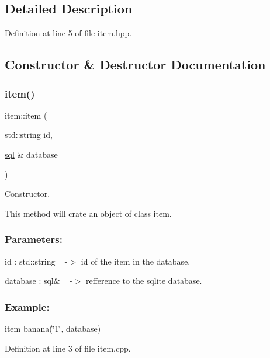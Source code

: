 \subsection{Detailed Description}


Definition at line 5 of file item.\+hpp.



\subsection{Constructor \& Destructor Documentation}
\mbox{\label{classitem_a235883f911ed8fad4679655a57d23d96}} 
\subsubsection{\texorpdfstring{item()}{item()}}
{\footnotesize\ttfamily item\+::item (\begin{DoxyParamCaption}\item[{std\+::string}]{id,  }\item[{\hyperlink{classsql}{sql} \&}]{database }\end{DoxyParamCaption})}



Constructor. 

This method will crate an object of class item.~\newline


\subsubsection*{Parameters\+: }

id \+: std\+::string ~\newline
-\/$>$ id of the item in the database.

database \+: sql\& ~\newline
-\/$>$ refference to the sqlite database.~\newline


\subsubsection*{Example\+: }

item banana(\char`\"{}1\char`\"{}, database)~\newline


Definition at line 3 of file item.\+cpp.



